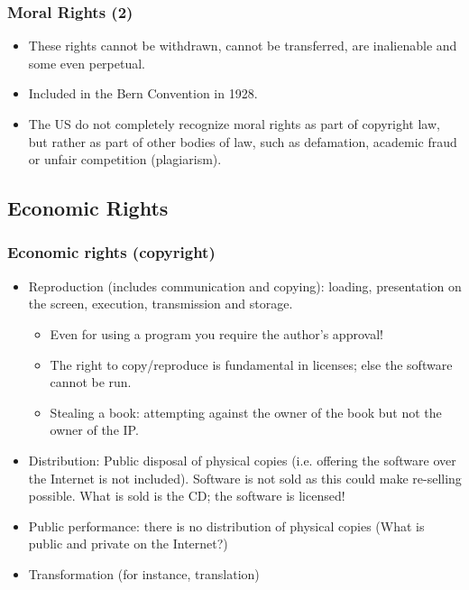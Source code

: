 \documentclass{beamer}
\begin{document}

\begin{frame}
\frametitle{Moral Rights (2)}

\begin{itemize}
\item These rights cannot be withdrawn, cannot be transferred, are inalienable
and some even perpetual.
\item Included in the Bern Convention in 1928. 
\item The US do not completely recognize moral rights as part of copyright law, but rather as part of other bodies of law, such as defamation, academic fraud or unfair competition (plagiarism).
\end{itemize}


\end{frame}



\subsection{Economic Rights}
\begin{frame}
\frametitle{Economic rights (copyright)}

\begin{itemize}
\item \alert{Reproduction} (includes communication and copying): loading,
presentation on the screen, execution, transmission and storage.
\begin{itemize}
\item Even for using a program you require the author's approval!
\item The right to copy/reproduce is fundamental in licenses; else
the software cannot be run.
\item Stealing a book: attempting against the owner
of the book but not the owner of the IP. 
\end{itemize}
\item \alert{Distribution:} Public disposal of physical copies {\small(i.e. offering
the software over the Internet is not included). Software is not
sold as this could make re-selling possible. What is sold is the CD; the
software is licensed!}
\item \alert{Public performance:} there is no distribution of physical copies {\small(What is public and private on the Internet?)}
\item \alert{Transformation} {\small(for instance, translation)}
\end{itemize}


\end{frame}
\end{document}
